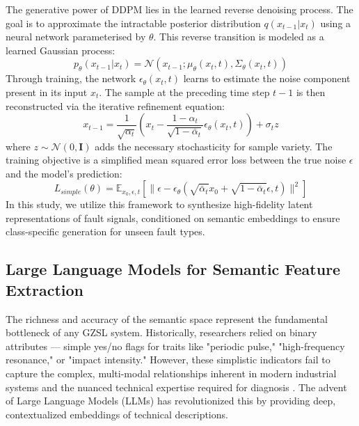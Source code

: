 The generative power of DDPM lies in the learned reverse denoising process. The goal is to approximate the intractable posterior distribution $q(x_{t-1}|x_t)$ using a neural network parameterised by $\theta$. This reverse transition is modeled as a learned Gaussian process:
\begin{equation}
p_\theta(x_{t-1}|x_t) = \mathcal{N}(x_{t-1}; \mu_\theta(x_t, t), \Sigma_\theta(x_t, t))
\end{equation}
Through training, the network $\epsilon_\theta(x_t, t)$ learns to estimate the noise component present in its input $x_t$. The sample at the preceding time step $t-1$ is then reconstructed via the iterative refinement equation:
\begin{equation}
x_{t-1} = \frac{1}{\sqrt{\alpha_t}} \left( x_t - \frac{1-\alpha_t}{\sqrt{1-\bar{\alpha}_t}} \epsilon_\theta(x_t, t) \right) + \sigma_t z
\end{equation}
where $z \sim \mathcal{N}(0, \mathbf{I})$ adds the necessary stochasticity for sample variety. The training objective is a simplified mean squared error loss between the true noise $\epsilon$ and the model's prediction:
\begin{equation}
L_{simple}(\theta) = \mathbb{E}_{x_0, \epsilon, t} \left[ \| \epsilon - \epsilon_\theta(\sqrt{\bar{\alpha}_t}x_0 + \sqrt{1-\bar{\alpha}_t}\epsilon, t) \|^2 \right]
\end{equation}
In this study, we utilize this framework to synthesize high-fidelity latent representations of fault signals, conditioned on semantic embeddings to ensure class-specific generation for unseen fault types.

\subsection{Large Language Models for Semantic Feature Extraction}
\label{subsec:llm_semantic}

The richness and accuracy of the semantic space represent the fundamental bottleneck of any GZSL system. Historically, researchers relied on binary attributes — simple yes/no flags for traits like "periodic pulse," "high-frequency resonance," or "impact intensity." However, these simplistic indicators fail to capture the complex, multi-modal relationships inherent in modern industrial systems and the nuanced technical expertise required for diagnosis \cite{devlin2018bert}. The advent of Large Language Models (LLMs) has revolutionized this by providing deep, contextualized embeddings of technical descriptions.

